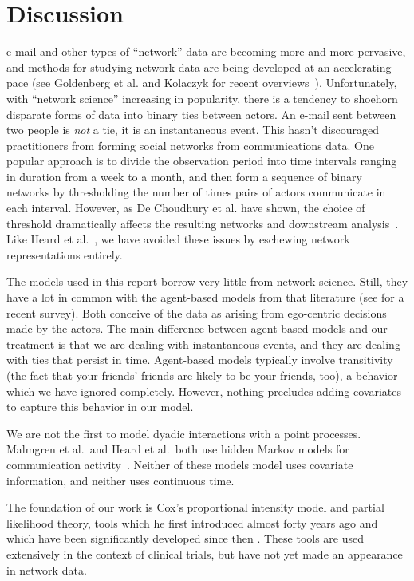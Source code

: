 \documentclass[aoas,preprint]{imsart}
\begin{document}
\section{Discussion}\label{S:discussion}

e-mail and other types of ``network'' data are becoming more and more pervasive,
and methods for studying network data are being developed at an accelerating
pace (see Goldenberg et al. and Kolaczyk for recent
overviews~\cite{goldenberg2009survey,kolaczyk2009statistical}).  Unfortunately,
with ``network science'' increasing in popularity, there is a tendency to
shoehorn disparate forms of data into binary ties between actors.  An e-mail
sent between two people is \emph{not} a tie, it is an instantaneous event.
This hasn't discouraged practitioners from forming social networks from
communications data.  One popular approach is to divide the observation period
into time intervals ranging in duration from a week to a month, and then form
a sequence of binary networks by thresholding the number of times pairs of
actors communicate in each interval.  However, as De Choudhury et al. have
shown, the choice of threshold dramatically affects the resulting networks and
downstream analysis~\cite{dechoudhury2010}.  Like
Heard et al.~\cite{heard2010bayesian}, we have avoided these issues by
eschewing network representations entirely.

The models used in this report borrow very little from network science.
Still, they have a lot in common with the agent-based models from that
literature (see \cite{snijders2010introduction} for a recent survey).  Both
conceive of the data as arising from ego-centric decisions made by the actors.
The main difference between agent-based models and our treatment is that we
are dealing with instantaneous events, and they are dealing with ties that
persist in time.  Agent-based models typically involve transitivity (the fact
that your friends' friends are likely to be your friends, too), a behavior
which we have ignored completely.  However, nothing precludes adding covariates
to capture this behavior in our model.

We are not the first to model dyadic interactions with a point processes.
Malmgren et al.\ and Heard et al.\ both use
hidden Markov models for communication activity~\cite{heard2010bayesian,
malmgen2009characterizing}.  Neither of these models model uses covariate
information, and neither uses continuous time.

The foundation of our work is Cox's proportional intensity model and partial
likelihood theory, tools which he first introduced almost forty years ago and
which have been significantly developed since then
\cite{andersen1993statistical,cook2007statistical,cox1972regression,cox1975partial,fleming1991counting,martinussen2006dynamic}.
These tools are used extensively in the context of clinical trials, but have
not yet made an appearance in network data.
\end{document}
